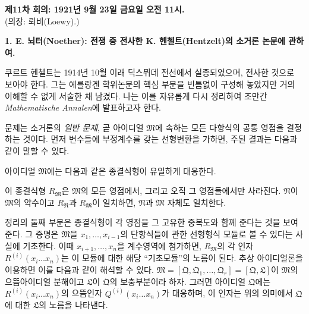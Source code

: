 
\begin{center}
\textbf{제11차 회의: 1921년 9월 23일 금요일 오전 11시.}\\
(의장: 뢰비(Loewy).)
\end{center}

\begin{center}
\textbf{1. E. 뇌터(Noether): 전쟁 중 전사한 K. 헨첼트(Hentzelt)의 소거론 논문에 관하여.}
\end{center}

쿠르트 헨첼트는 1914년 10월 이래 딕스뮈데 전선에서 실종되었으며, 전사한 것으로 보아야 한다. 그는 에를랑겐 학위논문의 핵심 부분을 빈틈없이 구성해 놓았지만 거의 이해할 수 없게 서술한 채 남겼다. 나는 이를 자유롭게 다시 정리하여 조만간 \emph{Mathematische Annalen}에 발표하고자 한다.

문제는 소거론의 \emph{일반 문제}, 곧 아이디얼 $\mathfrak M$에 속하는 모든 다항식의 공통 영점을 결정하는 것이다. 먼저 변수들에 부정계수를 갖는 선형변환을 가하면, 주된 결과는 다음과 같이 말할 수 있다.

아이디얼 $\mathfrak M$에는 다음과 같은 종결식형이 유일하게 대응한다.
\par\smallskip
\noindent{}
\par\smallskip\noindent
이 종결식형 $R_{\mathfrak M}$은 $\mathfrak M$의 모든 영점에서, 그리고 오직 그 영점들에서만 사라진다. $\mathfrak N$이 $\mathfrak M$의 약수이고 $R_{\mathfrak N}$과 $R_{\mathfrak M}$이 일치하면, $\mathfrak N$과 $\mathfrak M$ 자체도 일치한다.

정리의 둘째 부분은 종결식형이 각 영점을 그 고유한 중복도와 함께 준다는 것을 보여 준다. 그 증명은 $\mathfrak M$을 $x_1,\ldots,x_{i-1}$의 단항식들에 관한 선형형식 모듈로 볼 수 있다는 사실에 기초한다. 이때 $x_{i+1},\ldots,x_n$을 계수영역에 첨가하면, $R_{\mathfrak M}$의 각 인자 $R^{(i)}(x_i\ldots x_n)$는 이 모듈에 대한 해당 ``기초모듈''의 노름이 된다. 추상 아이디얼론을 이용하면 이를 다음과 같이 해석할 수 있다. $\mathfrak M=[\mathfrak Q,\mathfrak Q_1,\ldots,\mathfrak Q_r]=[\mathfrak Q,\mathfrak L]$이 $\mathfrak M$의 으뜸아이디얼 분해이고 $\mathfrak L$이 $\mathfrak Q$의 보충부분이라 하자. 그러면 아이디얼 $\mathfrak Q$에는 $R^{(i)}(x_i\ldots x_n)$의 으뜸인자 $Q^{(i)}(x_i\ldots x_n)$가 대응하며, 이 인자는 위의 의미에서 $\mathfrak Q$에 대한 $\mathfrak L$의 노름을 나타낸다.
